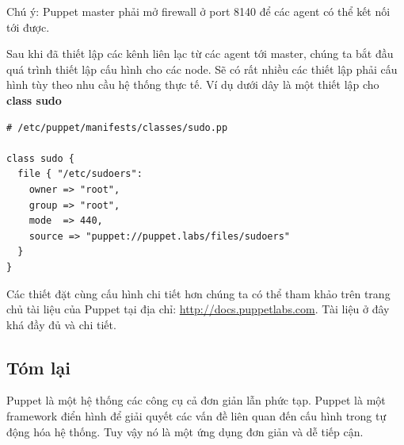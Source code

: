 Chú ý: Puppet master phải mở firewall ở port 8140 để các agent có thể kết nối tới được.

Sau khi đã thiết lập các kênh liên lạc từ các agent tới master, chúng ta bắt đầu quá trình thiết lập cấu hình cho các node. Sẽ có rất nhiều các thiết lập phải cấu hình tùy theo nhu cầu hệ thống thực tế. Ví dụ dưới dây là một thiết lập cho \textbf{class sudo}

\begin{lstlisting}[label={lst:puppet_config_class_sudo},caption={Cấu hình class sudo của Puppet},morekeywords={class, file, source, owner, group, mode, source}]
# /etc/puppet/manifests/classes/sudo.pp

class sudo {
  file { "/etc/sudoers":
    owner => "root",
    group => "root",
    mode  => 440,
    source => "puppet://puppet.labs/files/sudoers"
  }
}
\end{lstlisting}

Các thiết đặt cùng cấu hình chi tiết hơn chúng ta có thể tham khảo trên trang chủ tài liệu của Puppet tại địa chỉ: \url{http://docs.puppetlabs.com}. Tài liệu ở đây khá đầy đủ và chi tiết.

\subsection*{Tóm lại}

Puppet là một hệ thống các công cụ cả đơn giản lẫn phức tạp. Puppet là một framework điển hình để giải quyết các vấn đề liên quan đến cấu hình trong tự động hóa hệ thống. Tuy vậy nó là một ứng dụng đơn giản và dễ tiếp cận.
